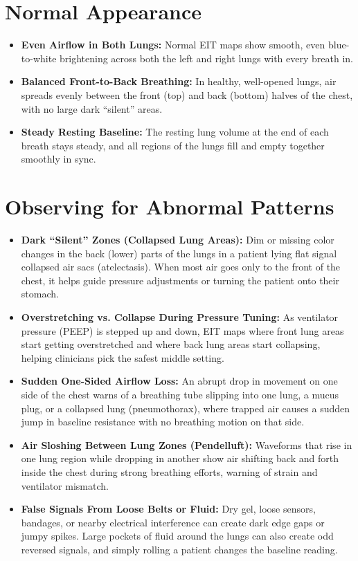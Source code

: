 \section{Normal Appearance}
\begin{itemize}
    \item \textbf{Even Airflow in Both Lungs:} Normal EIT maps show smooth, even blue-to-white brightening across both the left and right lungs with every breath in.
    \item \textbf{Balanced Front-to-Back Breathing:} In healthy, well-opened lungs, air spreads evenly between the front (top) and back (bottom) halves of the chest, with no large dark ``silent'' areas.
    \item \textbf{Steady Resting Baseline:} The resting lung volume at the end of each breath stays steady, and all regions of the lungs fill and empty together smoothly in sync.
\end{itemize}

\section{Observing for Abnormal Patterns}
\begin{itemize}
    \item \textbf{Dark ``Silent'' Zones (Collapsed Lung Areas):} Dim or missing color changes in the back (lower) parts of the lungs in a patient lying flat signal collapsed air sacs (atelectasis). When most air goes only to the front of the chest, it helps guide pressure adjustments or turning the patient onto their stomach.
    \item \textbf{Overstretching vs. Collapse During Pressure Tuning:} As ventilator pressure (PEEP) is stepped up and down, EIT maps where front lung areas start getting overstretched and where back lung areas start collapsing, helping clinicians pick the safest middle setting.
    \item \textbf{Sudden One-Sided Airflow Loss:} An abrupt drop in movement on one side of the chest warns of a breathing tube slipping into one lung, a mucus plug, or a collapsed lung (pneumothorax), where trapped air causes a sudden jump in baseline resistance with no breathing motion on that side.
    \item \textbf{Air Sloshing Between Lung Zones (Pendelluft):} Waveforms that rise in one lung region while dropping in another show air shifting back and forth inside the chest during strong breathing efforts, warning of strain and ventilator mismatch.
    \item \textbf{False Signals From Loose Belts or Fluid:} Dry gel, loose sensors, bandages, or nearby electrical interference can create dark edge gaps or jumpy spikes. Large pockets of fluid around the lungs can also create odd reversed signals, and simply rolling a patient changes the baseline reading.
\end{itemize}

